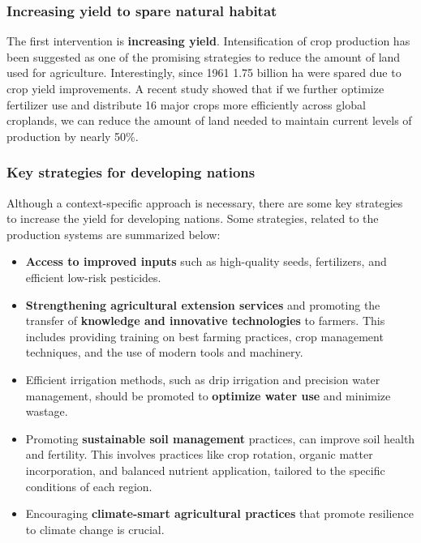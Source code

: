\documentclass[../summary.tex]{subfiles}
\begin{document}
	\subsubsection{Increasing yield to spare natural habitat}
	
	The first intervention is \textbf{increasing yield}. Intensification of crop production has been suggested as one of the promising strategies to reduce the amount of land used for agriculture. Interestingly, since 1961 1.75 billion \unit{\hectare} were spared due to crop yield improvements. A recent study showed that if we further optimize fertilizer use and distribute 16 major crops more efficiently across global croplands, we can reduce the amount of land needed to maintain current levels of production by nearly 50\%.
	
	\subsubsection{Key strategies for developing nations}
	
	Although a context-specific approach is necessary, there are some key strategies to increase the yield for developing nations. Some strategies, related to the production systems are summarized below:
	
	\begin{itemize}
		\item \textbf{Access to improved inputs} such as high-quality seeds, fertilizers, and efficient low-risk pesticides.
		\item \textbf{Strengthening agricultural extension services }and promoting the transfer of \textbf{knowledge and innovative technologies} to farmers. This includes providing training on best farming practices, crop management techniques, and the use of modern tools and machinery.
		\item Efficient irrigation methods, such as drip irrigation and precision water management, should be promoted to \textbf{optimize water use} and minimize wastage.
		\item Promoting \textbf{sustainable soil management} practices, can improve soil health and fertility. This involves practices like crop rotation, organic matter incorporation, and balanced nutrient application, tailored to the specific conditions of each region.
		\item Encouraging \textbf{climate-smart agricultural practices} that promote resilience to climate change is crucial. 	
	\end{itemize} %
	
\end{document}
